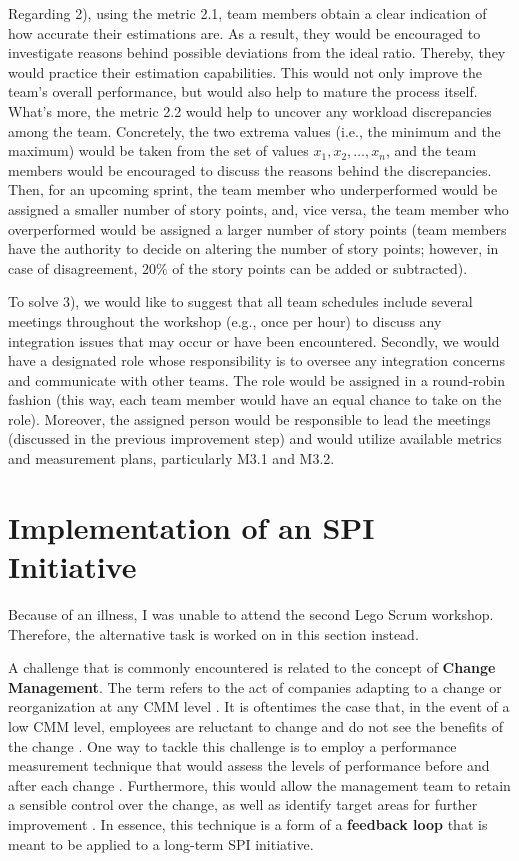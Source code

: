 \documentclass[conference]{IEEEtran}
\begin{document}
Regarding 2), using the metric 2.1, team members obtain a clear indication of
how accurate their estimations are. As a result, they would be encouraged to
investigate reasons behind possible deviations from the ideal ratio. Thereby,
they would practice their estimation capabilities. This would not only improve
the team's overall performance, but would also help to mature the process
itself. What's more, the metric 2.2 would help to uncover any workload
discrepancies among the team. Concretely, the two extrema values (i.e., the
minimum and the maximum) would be taken from the set of values $x_1, x_2,
\dots, x_n$, and the team members would be encouraged to discuss the reasons
behind the discrepancies. Then, for an upcoming sprint, the team member who
underperformed would be assigned a smaller number of story points, and, vice
versa, the team member who overperformed would be assigned a larger number of
story points (team members have the authority to decide on altering the number
of story points; however, in case of disagreement, $20\%$ of the story points
can be added or subtracted).

To solve 3), we would like to suggest that all team schedules include several
meetings throughout the workshop (e.g., once per hour) to discuss any
integration issues that may occur or have been encountered. Secondly, we would
have a designated role whose responsibility is to oversee any integration
concerns and communicate with other teams. The role would be assigned in a
round-robin fashion (this way, each team member would have an equal chance to
take on the role). Moreover, the assigned person would be responsible to lead
the meetings (discussed in the previous improvement step) and would utilize
available metrics and measurement plans, particularly M3.1 and M3.2.

\section{Implementation of an SPI Initiative}
\label{sec:implementation}

Because of an illness, I was unable to attend the second Lego Scrum workshop.
Therefore, the alternative task is worked on in this section instead.

A challenge that is commonly encountered is related to the concept of
\textbf{Change Management}. The term refers to the act of companies adapting to
a change or reorganization at any CMM level \cite{Beecham2003}. It is
oftentimes the case that, in the event of a low CMM level, employees are
reluctant to change and do not see the benefits of the change
\cite{Beecham2003}. One way to tackle this challenge is to employ a performance
measurement technique that would assess the levels of performance before and
after each change \cite{Oakland2007}. Furthermore, this would allow the
management team to retain a sensible control over the change, as well as
identify target areas for further improvement \cite{Oakland2007}. In essence,
this technique is a form of a \textbf{feedback loop} that is meant to be
applied to a long-term SPI initiative.
\end{document}
